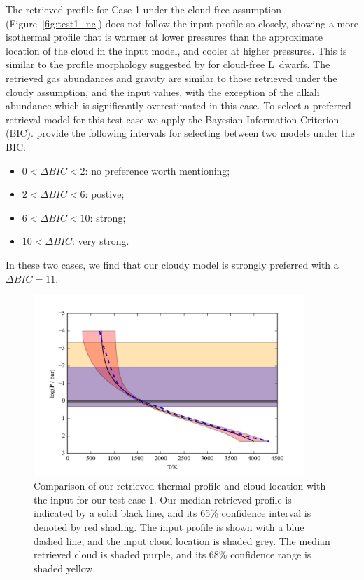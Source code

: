 \documentclass[useAMS,usenatbib]{mn2e}
\begin{document}

The retrieved profile for Case 1 under the cloud-free assumption (Figure~\ref{fig:test1_nc}) does not follow the input profile so closely, showing a more isothermal profile that is warmer at lower pressures than the approximate location of the cloud in the input model, and cooler at higher pressures. This is similar to the profile morphology suggested by \citet{tremblin2015,tremblin2016} for cloud-free L~dwarfs.  The retrieved gas abundances and gravity are similar to those retrieved under the cloudy assumption, and the input values, with the exception of the alkali abundance which is significantly overestimated in this case.  
To select a preferred retrieval model for this test case we apply the Bayesian Information Criterion (BIC). \citet{kass1995} provide the following intervals for selecting between two models under the BIC:

\begin{itemize}
  \item $0  < \Delta BIC < 2$: no preference worth mentioning;
  \item $2  < \Delta BIC < 6$: postive;
  \item $6  < \Delta BIC < 10$: strong;
 \item $10  < \Delta BIC$: very strong.
\end{itemize}
In these two cases, we find that our cloudy model is strongly preferred with a $\Delta BIC =11$. 



\begin{figure}
\hspace{-0.8cm}\includegraphics[width=290pt]{TestBD_Case1_prof_1sigma.png}
\caption{Comparison of our retrieved thermal profile and cloud location with the input for our test case 1. Our median retrieved profile is indicated by a solid black line, and its 65\% confidence interval is denoted by red shading. The input profile is shown with a blue dashed line, and the input cloud location is shaded grey. The median retrieved cloud is shaded purple, and its 68\% confidence range is shaded yellow.
\label{fig:test1_cld}}
\end{figure}
\end{document}
